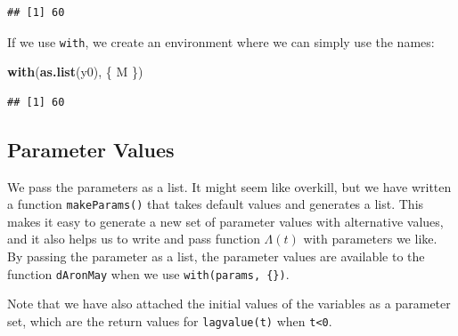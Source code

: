 \documentclass[
]{book}
\newenvironment{Shaded}{\begin{snugshade}}{\end{snugshade}}
\newcommand{\FunctionTok}[1]{\textcolor[rgb]{0.13,0.29,0.53}{\textbf{#1}}}
\newcommand{\NormalTok}[1]{#1}
\begin{document}
\begin{verbatim}
## [1] 60
\end{verbatim}

If we use \texttt{with}, we create an environment where we can simply use the names:

\begin{Shaded}
\begin{Highlighting}[]
\FunctionTok{with}\NormalTok{(}\FunctionTok{as.list}\NormalTok{(y0), \{}
\NormalTok{  M}
\NormalTok{\})}
\end{Highlighting}
\end{Shaded}

\begin{verbatim}
## [1] 60
\end{verbatim}

\hypertarget{parameter-values}{%
\subsection{Parameter Values}\label{parameter-values}}

We pass the parameters as a list. It might seem like overkill, but we have written a function \texttt{makeParams()} that takes default values and generates a list. This makes it easy to generate a new set of parameter values with alternative values, and it also helps us to write and pass function \(\Lambda(t)\) with parameters we like. By passing the parameter as a list, the parameter values are available to the function \texttt{dAronMay} when we use \texttt{with(params,\ \{\})}.

Note that we have also attached the initial values of the variables as a parameter set, which are the return values for \texttt{lagvalue(t)} when \texttt{t\textless{}0}.
\end{document}
